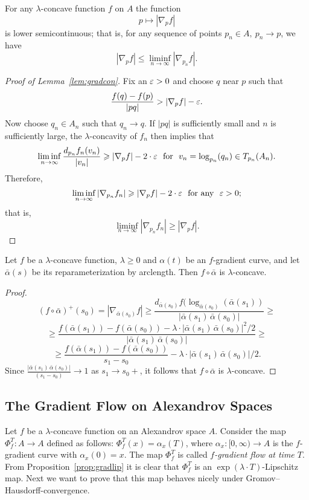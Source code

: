 \documentclass{amsart}
\begin{document}
\begin{cor}\label{cor:gradlim} 
For any $\lambda$-concave function $f$ on $A$
the function 
$$p\mapsto|\nabla_pf|$$ 
is lower semicontinuous;
that is, for any sequence of points $p_n\in A,\  p_n\to p$, we have
$$|\nabla_p f|\le \liminf_{n\to \infty} |\nabla_{p_n} f|.$$

\end{cor}

\begin{proof}[Proof of Lemma~\ref{lem:gradcon}] Fix an $\varepsilon>0$ and choose $q$ near $p$ such
that
$$\frac{f(q)-f(p)}{|pq|}> |\nabla_p f|-\varepsilon.$$
Now choose $q_n\in A_n$ such that $q_n\to q$.
If $|pq|$ is sufficiently small and $n$ is
sufficiently large,  the $\lambda$-concavity of $f_n$ then implies that
$$\liminf_{n\to \infty}\frac{d_{p_n}f_n(v_n)}{|v_n|}\ge |\nabla_p f|-2\cdot \eps \ \ \text{for}\ \  v_n=
\log_{p_n}(q_n)\in T_{p_n}(A_n).$$
Therefore,
$$\liminf_{n\to \infty} |\nabla_{p_n} f_n|\geqslant
|\nabla_p f|-2\cdot \varepsilon \ \ \text{for any}\ \ \varepsilon>0;$$
that is,
$$\liminf_{n\to \infty} |\nabla_{p_n} f_n|\ge
|\nabla_p f|. $$
\end{proof}

\begin{lem}\label{lem:concave}Let $f$ be a $\lambda$-concave function,  $\lambda\ge 0$ and $\alpha(t)$ be an $f$-gradient curve, and let $\bar\alpha(s)$ be its reparameterization by arclength. Then $f\circ\bar\alpha$ is  $\lambda$-concave.
\end{lem}

\begin{proof}

$$(f\circ\bar\alpha)^+(s_0)=|\nabla_{\bar\alpha(s_0)}f|
\ge
 \frac{d_{\bar\alpha(s_0)}f(\log_{\bar\alpha(s_0)}(\bar\alpha(s_1))}
 { |\bar\alpha(s_1)\,\bar\alpha(s_0)|}
 \ge$$
$$
\ge\frac{f(\bar\alpha(s_1))-f(\bar\alpha(s_0))
-
\lambda\cdot  |\bar\alpha(s_1)\,\bar\alpha(s_0)|^2/2 }{|\bar\alpha(s_1)\,\bar\alpha(s_0)|}
\ge $$
$$\ge
\frac{f(\bar\alpha(s_1))-f(\bar\alpha(s_0))}{ s_1-s_0}
-
\lambda\cdot |\bar\alpha(s_1)\,\bar\alpha(s_0)|/2.$$
Since $\frac{|\bar\alpha(s_1)\,\bar\alpha(s_0)|}{(s_1-s_0)}\to 1$
 as $s_1\to s_0+$, it follows that $f\circ\bar\alpha$ is  $\lambda$-concave.

\end{proof}





\subsection{ The Gradient Flow on Alexandrov Spaces}
Let $f$ be a $\lambda$-concave function on an Alexandrov space $A$.
Consider the map $\Phi_f^T\colon A\to A$ defined as follows:
$\Phi_f^T(x)=\alpha_x(T)$, where $\alpha_x\colon [0,\infty)\to A$ is the $f$-gradient curve with $\alpha_x(0)=x$.
The map $\Phi_f^T$ is called
{\it $f$-gradient flow at time $T$}. From Proposition~\ref{prop:gradlip}  it is clear that  $\Phi_f^T$ is an $\exp(\lambda\cdot  T)$-Lipschitz map. Next we want to prove that this map behaves nicely under Gromov--Hausdorff-convergence.
\end{document}
